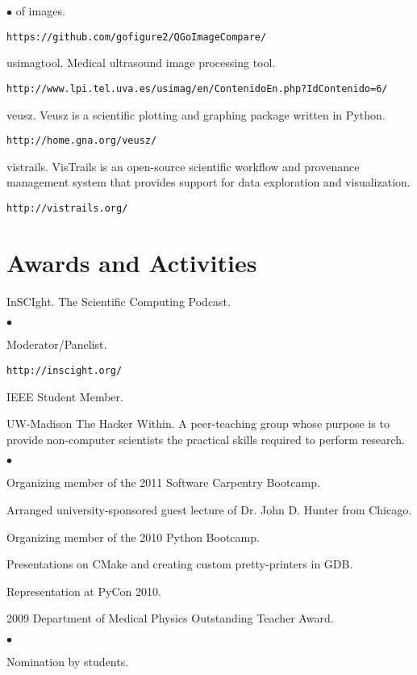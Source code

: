 \documentclass[margin,line]{res}
\newenvironment{list2}{
  \begin{list}{$\bullet$}{%
      \setlength{\itemsep}{0in}
      \setlength{\parsep}{0in} \setlength{\parskip}{0in}
      \setlength{\topsep}{0in} \setlength{\partopsep}{0in} 
      \setlength{\leftmargin}{0.2in}}}{\end{list}}
\begin{document}
\begin{resume}
\begin{list2}
  of images.
  \begin{verbatim}https://github.com/gofigure2/QGoImageCompare/\end{verbatim}
\item usimagtool.  Medical ultrasound image processing tool.
  \begin{verbatim}http://www.lpi.tel.uva.es/usimag/en/ContenidoEn.php?IdContenido=6/\end{verbatim}
\item veusz.  Veusz is a scientific plotting and graphing package written in
  Python.  \begin{verbatim}http://home.gna.org/veusz/\end{verbatim}
\item vistrails.  VisTrails is an open-source scientific workflow and provenance
  management system that provides support for data exploration and visualization.
  \begin{verbatim}http://vistrails.org/\end{verbatim}
\end{list2}

\section{\sc Awards and Activities}
InSCIght.  The Scientific Computing Podcast.  
\begin{list2}
\item Moderator/Panelist.
\item \verb#http://inscight.org/#
\end{list2}

IEEE Student Member.

UW-Madison The Hacker Within.  A peer-teaching group whose purpose is to provide
non-computer scientists the practical skills required to perform research.
\begin{list2}
\item Organizing member of the 2011 Software Carpentry Bootcamp.
\item Arranged university-sponsored guest lecture of Dr. John D. Hunter from Chicago.
\item Organizing member of the 2010 Python Bootcamp.
\item Presentations on CMake and creating custom pretty-printers in GDB.
\item Representation at PyCon 2010.
\end{list2}

2009 Department of Medical Physics Outstanding Teacher Award.
\begin{list2}
\item  Nomination by students.
\end{list2}


\end{resume}
\end{document}
